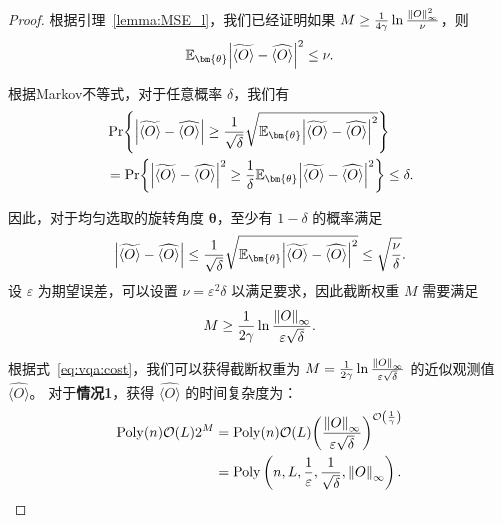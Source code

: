\begin{proof}

  根据引理~\ref{lemma:MSE_l}，我们已经证明如果 $M\geq\frac{1}{4\gamma}\ln{\frac{\norm{O}_\infty^2}{\nu}}$，则
 \begin{equation}
  \mathbb{E}_{\bm{\theta}}\abs{\widetilde{\langle O\rangle}-\widehat{\langle O\rangle}}^2 \leq \nu.
 \end{equation}
  
 根据Markov不等式，对于任意概率 $\delta$，我们有
 \begin{equation}
    \begin{aligned}
        &\Pr{\abs{\widetilde{\langle O\rangle}-\widehat{\langle O\rangle}}\geq\frac{1}{\sqrt{\delta}}\sqrt{\mathbb{E}_{\bm{\theta}}\abs{\widetilde{\langle O\rangle}-\widehat{\langle O\rangle}}^2}}\\
        &=\Pr{\abs{\widetilde{\langle O\rangle}-\widehat{\langle O\rangle}}^2\geq\frac{1}{\delta}{\mathbb{E}_{\bm{\theta}}\abs{\widetilde{\langle O\rangle}-\widehat{\langle O\rangle}}^2}}\leq \delta.
    \end{aligned}
 \end{equation}

因此，对于均匀选取的旋转角度 $\bm{\theta}$，至少有 $1-\delta$ 的概率满足
\begin{equation}
  \abs{\widetilde{\langle O\rangle}-\widehat{\langle O\rangle}} \leq \frac{1}{\sqrt{\delta}}\sqrt{\mathbb{E}_{\bm{\theta}}\abs{\widetilde{\langle O\rangle}-\widehat{\langle O\rangle}}^2}\leq \sqrt{\frac{\nu}{\delta}}.
\end{equation}
设 $\varepsilon$ 为期望误差，可以设置 $\nu=\varepsilon^2 \delta$ 以满足要求，因此截断权重 $M$ 需要满足
\begin{equation}
  M\geq \frac{1}{2\gamma} \ln{\frac{\norm{O}_\infty}{\varepsilon \sqrt{\delta}}}.
\end{equation}

根据式~\ref{eq:vqa:cost}，我们可以获得截断权重为 $M=\frac{1}{2\gamma} \ln{\frac{\norm{O}_\infty}{\varepsilon \sqrt{\delta}}}$ 的近似观测值 $\widehat{\langle O\rangle}$。
对于\textbf{情况1}，获得 $\widehat{\langle O\rangle}$ 的时间复杂度为：
\begin{equation}
\begin{aligned}
\mathrm{Poly}(n) \order{L} 2^{M}
&=\mathrm{Poly}(n) \order{L} \bigg(\frac{\norm{O}_\infty}{\varepsilon \sqrt{\delta}} \bigg)^{\order{\frac{1}{\gamma}}}\\
&=\mathrm{Poly}\left(n,L,\frac{1}{\varepsilon},\frac{1}{\sqrt{\delta}},\norm{O}_{\infty}\right).
\end{aligned}
\end{equation}


\end{proof}
